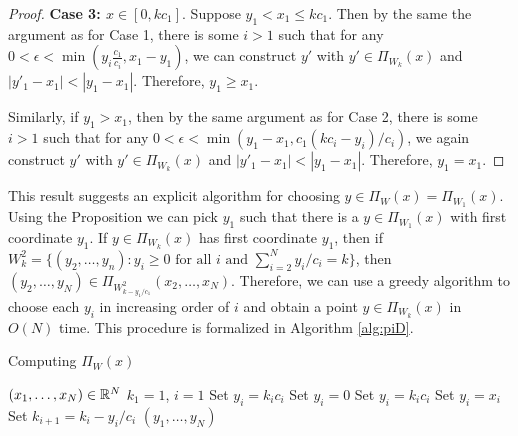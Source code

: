 \documentclass[12pt]{colt2018} %
\begin{document}
\begin{proof}
\textbf{Case 3: $x\in[0,kc_1]$}. Suppose $y_1<x_1\le kc_1$. Then by the same the argument as for Case 1, there is some $i>1$ such that for any $0<\epsilon<\min(y_i\frac{c_1}{c_i}, x_1-y_1)$, we can construct $y'$ with $y'\in \Pi_{W_k}(x)$ and $|y'_1-x_1|<|y_1-x_1|$. Therefore, $y_1\ge x_1$.

Similarly, if $y_1>x_1$, then by the same argument as for Case 2, there is some $i>1$ such that for any $0<\epsilon<\min(y_1-x_1,c_1(kc_i - y_i)/c_i)$, we again construct $y'$ with $y'\in \Pi_{W_k}(x)$ and $|y'_1-x_1|<|y_1-x_1|$. Therefore, $y_1= x_1$.
\end{proof}

This result suggests an explicit algorithm for choosing $y\in \Pi_W(x)=\Pi_{W_1}(x)$. Using the Proposition we can pick $y_1$ such that there is a $y\in \Pi_{W_1}(x)$ with first coordinate $y_1$. If $y\in \Pi_{W_k}(x)$ has first coordinate $y_1$, then if $W^2_{k} = \{(y_2,\dots,y_n):y_i\ge 0\text{ for all }i\text{ and }\sum_{i=2}^N y_i/c_i=k\}$, then $(y_2,\dots,y_N)\in \Pi_{W^2_{k-y_1/c_1}}(x_2,\dots,x_N)$. Therefore, we can use a greedy algorithm to choose each $y_i$ in increasing order of $i$ and obtain a point $y\in\Pi_{W_k}(x)$ in $O(N)$ time. This procedure is formalized in Algorithm \ref{alg:piD}.

\begin{algorithm}[h]
   \caption{Computing $\Pi_W(x)$}
   \label{alg:piD}
\begin{algorithmic}[1]
   \REQUIRE $(x_1,\dots,x_N)\in\mathbb{R}^N$
    {$k_1=1$, $i=1$}
        \STATE Set $y_i = k_i c_i$
   \ELSE
        \STATE Set $y_i = 0$
    \ENDIF
        \STATE Set $y_i = k_ic_i$
    \ENDIF
    \IF{$x_i\in(0,k_ic_i]$}
        \STATE Set $y_i = x_i$
    \ENDIF
   \STATE Set $k_{i+1} = k_i-y_i/c_i$
   \ENDIF
   \ENDFOR
   \RETURN $(y_1,\dots,y_N)$
\end{algorithmic}
\end{algorithm}
\end{document}
